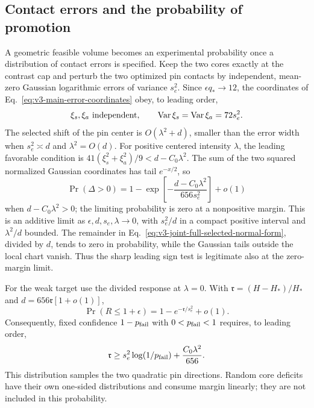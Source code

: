 \documentclass[aps,pre,reprint,amsmath,amssymb,longbibliography]{revtex4-2}
\begin{document}
\subsection{Contact errors and the probability of promotion}
\label{app:v7-gaussian-tolerance}
A geometric feasible volume becomes an experimental probability
once a distribution of contact errors is specified. Keep the two
cores exactly at the contrast cap and perturb the two optimized
pin contacts by independent, mean-zero Gaussian logarithmic errors
of variance $s_e^2$. Since $\epsilon q_*\to12$, the coordinates
of Eq.~\eqref{eq:v3-main-error-coordinates} obey, to leading order,
\begin{equation}
 \xi_s,\xi_a\ \hbox{independent},\qquad
 \operatorname{Var}\xi_s=\operatorname{Var}\xi_a=72s_e^2.
 \label{eq:v7-gaussian-pin-variance}
\end{equation}
The selected shift of the pin center is $O(\lambda^2+d)$, smaller
than the error width when $s_e^2\asymp d$ and $\lambda^2=O(d)$.
For positive centered intensity $\lambda$, the leading favorable
condition is
$41(\xi_s^2+\xi_a^2)/9<d-C_0\lambda^2$.
The sum of the two squared normalized Gaussian coordinates has
tail $e^{-x/2}$, so
\begin{equation}
 \Pr(\Delta>0)
 =1-\exp\!\left[-\frac{d-C_0\lambda^2}{656s_e^2}\right]+o(1)
 \label{eq:v7-gaussian-success}
\end{equation}
when $d-C_0\lambda^2>0$; the limiting probability is zero at a
nonpositive margin. This is an additive limit as
$\epsilon,d,s_e,\lambda\to0$, with $s_e^2/d$ in a compact positive
interval and $\lambda^2/d$ bounded. The remainder in
Eq.~\eqref{eq:v3-joint-full-selected-normal-form}, divided by $d$,
tends to zero in probability, while the Gaussian tails outside the
local chart vanish. Thus the sharp leading sign test is legitimate
also at the zero-margin limit.

For the weak target use the divided response at $\lambda=0$.
With $\mathfrak r=(H-H_*)/H_*$ and $d=656\mathfrak r[1+o(1)]$,
\begin{equation}
 \Pr(R\le1+\epsilon)=1-e^{-\mathfrak r/s_e^2}+o(1).
 \label{eq:v7-gaussian-weak-success}
\end{equation}
Consequently, fixed confidence $1-p_{\rm fail}$ with $0<p_{\rm fail}<1$
requires, to leading order,
\begin{equation}
 \mathfrak r\ge s_e^2\log(1/p_{\rm fail})
                  +\frac{C_0\lambda^2}{656}.
 \label{eq:v7-gaussian-confidence}
\end{equation}
This distribution samples the two quadratic pin directions.
Random core deficits have their own one-sided distributions and
consume margin linearly; they are not included in this probability.
\end{document}
